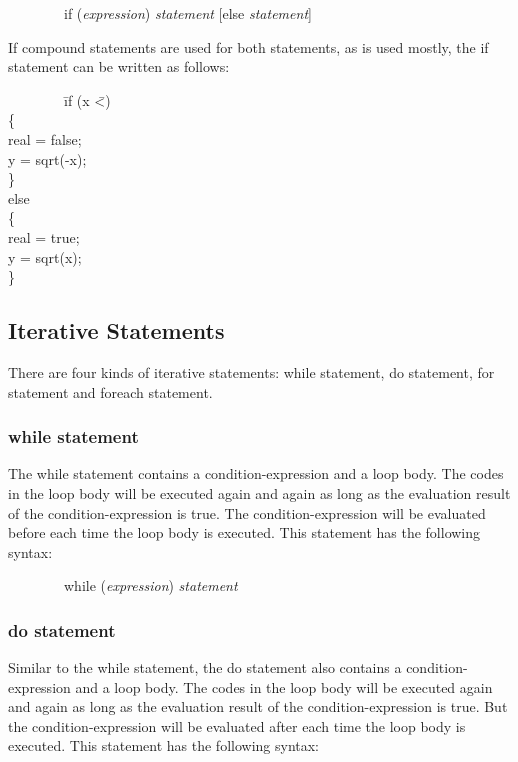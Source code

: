 \documentclass[12pt,psfig,a4]{article}
\begin{document}
\begin{code}
\begin{tabbing}
~~~~~~~~if (\textsl{expression}) \textsl{statement} [else \textsl{statement}]
\end{tabbing}
\end{code}

If compound statements are used for both statements, as is used mostly, the if statement can be written as follows:

\begin{code}
\begin{tabbing}
~~~~~~~~\= if (x \= \textless {}) \\
\> \{ \\
\> \> real = false; \\
\> \> y = sqrt(-x); \\
\> \} \\
\> else \\
\> \{ \\
\> \> real = true; \\
\> \> y = sqrt(x); \\
\> \}
\end{tabbing}
\end{code}

\subsection{Iterative Statements}
There are four kinds of iterative statements: while statement, do statement, for statement and foreach statement.

\subsubsection{while statement}
The while statement contains a condition-expression and a loop body. The codes in the loop body will be executed again and again as long as the evaluation result of the condition-expression is true. The condition-expression will be evaluated before each time the loop body is executed. This statement has the following syntax:

\begin{code}
\begin{tabbing}
~~~~~~~~while (\textsl{expression}) \textsl{statement}
\end{tabbing}
\end{code}

\subsubsection{do statement}
Similar to the while statement, the do statement also contains a condition-expression and a loop body. The codes in the loop body will be executed again and again as long as the evaluation result of the condition-expression is true. But the condition-expression will be evaluated after each time the loop body is executed. This statement has the following syntax:
\end{document}
